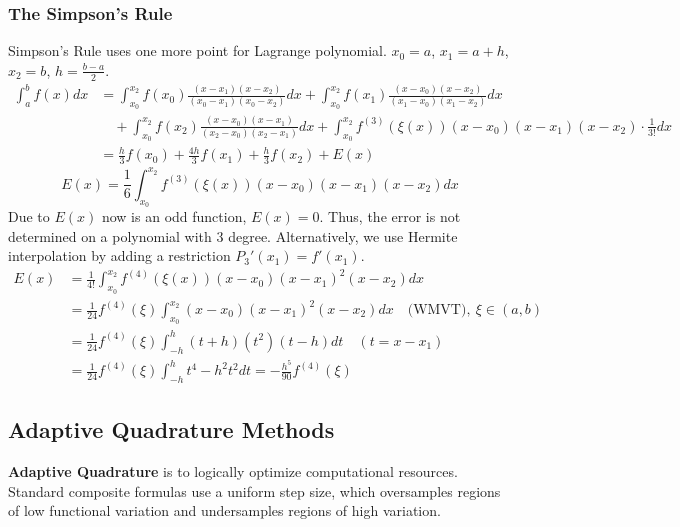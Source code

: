 \documentclass[12pt, a4paper]{article}
\theoremstyle{break}
\begin{document}
\subsubsection*{The Simpson's Rule}
Simpson's Rule uses one more point for Lagrange polynomial. $x_0 = a$, $x_1 = a+h$, $x_2 = b$, $h = \frac{b-a}{2}$.
\begin{align*}
\int_a^b f(x) dx &= \int_{x_0}^{x_2} f(x_0) \frac{(x-x_1)(x-x_2)}{(x_0-x_1)(x_0-x_2)} dx + \int_{x_0}^{x_2} f(x_1) \frac{(x-x_0)(x-x_2)}{(x_1-x_0)(x_1-x_2)} dx \\
&\quad + \int_{x_0}^{x_2} f(x_2) \frac{(x-x_0)(x-x_1)}{(x_2-x_0)(x_2-x_1)} dx + \int_{x_0}^{x_2} f^{(3)}(\xi(x)) (x-x_0)(x-x_1)(x-x_2) \cdot \frac{1}{3!} dx \\
&= \frac{h}{3} f(x_0) + \frac{4h}{3} f(x_1) + \frac{h}{3} f(x_2) + E(x)
\end{align*}
\[ E(x) = \frac{1}{6} \int_{x_0}^{x_2} f^{(3)}(\xi(x)) (x-x_0)(x-x_1)(x-x_2) dx \]
Due to $E(x)$ now is an odd function, $E(x) = 0$. Thus, the error is not determined on a polynomial with $3$ degree. Alternatively, we use Hermite interpolation by adding a restriction $P_3'(x_1) = f'(x_1)$.
\begin{align*}
E(x) &= \frac{1}{4!} \int_{x_0}^{x_2} f^{(4)}(\xi(x)) (x-x_0)(x-x_1)^2(x-x_2) dx \\
&= \frac{1}{24} f^{(4)}(\xi) \int_{x_0}^{x_2} (x-x_0)(x-x_1)^2(x-x_2) dx \quad \text{(WMVT)}, \ \xi \in (a,b) \\
&= \frac{1}{24} f^{(4)}(\xi) \int_{-h}^{h} (t+h)(t^2)(t-h) dt \quad (t = x-x_1) \\
&= \frac{1}{24} f^{(4)}(\xi) \int_{-h}^{h} t^4 - h^2 t^2 dt = -\frac{h^5}{90} f^{(4)}(\xi)
\end{align*}

\subsection{Adaptive Quadrature Methods}
\textbf{Adaptive Quadrature} is to logically optimize computational resources. Standard composite formulas use a uniform step size, which oversamples regions of low functional variation and undersamples regions of high variation.
\end{document}
